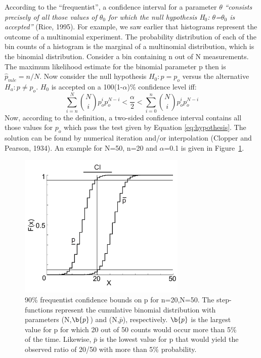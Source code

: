\documentclass{article}
\begin{document}
According  to  the  ``frequentist'',   a  confidence  interval  for  a
parameter $\theta$  {\it ``consists precisely  of all those  values of
$\theta_0$ for which the null hypothesis H$_0$: $\theta$=$\theta_0$ is
accepted''} (Rice, 1995).  For example, we saw earlier that histograms
represent the  outcome of  a multinomial experiment.   The probability
distribution of each of the bin  counts of a histogram is the marginal
of  a multinomial  distribution, which  is the  binomial distribution.
Consider  a bin  containing  n  out of  N  measurements.  The  maximum
likelihood   estimate   for  the   binomial   parameter   p  then   is
$\hat{p}_{mle} = n/N$.  Now  consider the null hypothesis $H_0: p=p_o$
versus  the alternative $H_a:  p \neq  p_o$.  $H_0$  is accepted  on a
100(1-$\alpha$)\% confidence level iff:
\begin{equation}
  \label{eq:hypothesis}
\sum_{i=n}^N  \binom{N}{i} p_o^i  p_o^{N-i} < 
\frac{\alpha}{2} <
\sum_{i=0}^n  \binom{N}{i} p_o^i  p_o^{N-i} 
\end{equation}
Now,  according to  the  definition, a  two-sided confidence  interval
contains  all those  values for  $p_o$ which  pass the  test  given by
Equation \ref{eq:hypothesis}.  The solution  can be found by numerical
iteration  and/or  interpolation  (Clopper  and  Pearson,  1934).   An
example   for    N=50,   n=20    and   $\alpha$=0.1   is    given   in
Figure~\ref{fig:frequentist2D}.

\begin{figure}[h]
  \centering
  \includegraphics[width=8cm]{2.pdf}
  \caption{90\% frequentist confidence bounds on p for n=20,N=50. The
  step-functions represent  the cumulative binomial  distribution with
  parameters (N,$\b{p}$) and  (N,$\bar{p}$), respectively.  $\b{p}$ is
  the largest  value for p for which  20 out of 50  counts would occur
  more than 5\%  of the time. Likewise, $\bar{p}$  is the lowest value
  for p  that would yield the  observed ratio of 20/50  with more than
  5\% probability.}
  \label{fig:frequentist2D}
\end{figure}
\end{document}
